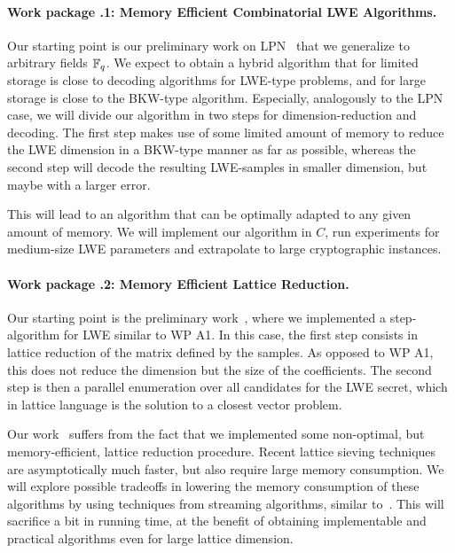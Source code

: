 \renewcommand{\theworkpackage}{\Alph{workpackage}}
\setcounter{workpackage}{0}
\label{am:wp:eins}


\paragraph{Work package \theworkpackage.1: Memory Efficient Combinatorial LWE Algorithms.}

Our starting point is our preliminary work on LPN~\cite{LPN} that we generalize to arbitrary fields $\mathbb{F}_q$. We expect to obtain a hybrid algorithm that for limited storage is close to decoding algorithms for LWE-type problems, and for large storage is close to the BKW-type algorithm. Especially, analogously to the LPN case, we will divide our algorithm in two steps for dimension-reduction and decoding. The first step makes use of some limited amount of memory to reduce the LWE dimension in a BKW-type manner as far as possible, whereas the second step will decode the resulting LWE-samples in smaller dimension, but maybe with a larger error.

This will lead to an algorithm that can be optimally adapted to any given amount of memory. We will implement our algorithm in $C$, run experiments for medium-size LWE parameters and extrapolate to large cryptographic instances.

\paragraph{Work package \theworkpackage.2: Memory Efficient Lattice Reduction.} 

Our starting point is the preliminary work~\cite{BDD}, where we implemented a step-algorithm for LWE similar to WP A1. In this case, the first step consists in lattice reduction of the matrix defined by the samples. As opposed to WP A1, this does not reduce the dimension but the size of the coefficients. The second step is then a parallel enumeration over all candidates for the LWE secret, which in lattice language is the solution to a closest vector problem.

Our work~\cite{BDD} suffers from the fact that we implemented some non-optimal, but memory-efficient, lattice reduction procedure. Recent lattice sieving techniques~\cite{} are asymptotically much faster, but also require large memory consumption. We will explore possible tradeoffs in lowering the memory consumption of these algorithms by using techniques from streaming algorithms, similar to~\cite{LPN}. This will sacrifice a bit in running time, at the benefit of obtaining implementable and practical algorithms even for large lattice dimension.

